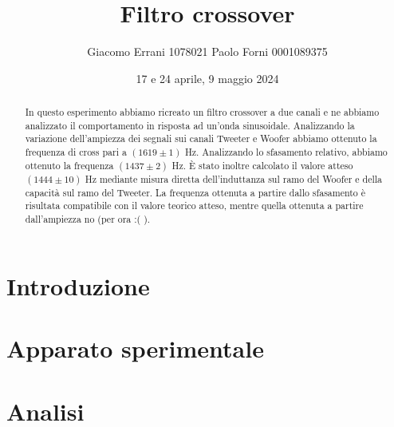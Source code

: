 \documentclass[12pt,a4paper]{article}
\title{Filtro crossover} %
\date{17 e 24 aprile, 9 maggio 2024}
\author{Giacomo Errani 1078021 Paolo Forni 0001089375}
\begin{document}

\newcommand{\numberthis}{\addtocounter{equation}{1}\tag{\theequatio}}

\newcommand{\theoryF}{ $(1444 \pm 10)$ Hz}
\newcommand{\amplitudeF}{$(1619 \pm 1)$ Hz}
\newcommand{\phaseF}{$(1437 \pm 2)$ Hz}

\maketitle

\begin{abstract}

  In questo esperimento abbiamo ricreato un filtro crossover a due canali e ne abbiamo analizzato il comportamento
  in risposta ad un'onda sinusoidale. Analizzando la variazione dell'ampiezza dei segnali sui canali Tweeter e Woofer
  abbiamo ottenuto la frequenza di cross pari a \amplitudeF. Analizzando lo sfasamento relativo, abbiamo ottenuto la
  frequenza \phaseF. È stato inoltre calcolato il valore atteso \theoryF \hspace{1pt}
  mediante misura diretta dell'induttanza sul ramo del Woofer e della capacità sul ramo del Tweeter.
  La frequenza ottenuta a partire dallo sfasamento è risultata compatibile con il valore teorico atteso, mentre quella
  ottenuta a partire dall'ampiezza no (per ora :( ).

\end{abstract}


\section{Introduzione}\label{sec:introduzione}

  


\section{Apparato sperimentale}\label{sec:apparato-sperimentale}

  


\section{Analisi}\label{sec:analisi}

  
\end{document}
